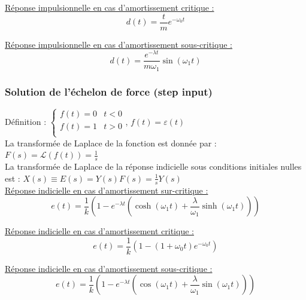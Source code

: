 \documentclass[../main.tex]{subfiles}
\begin{document}
\quad \underline{Réponse impulsionnelle en cas d'amortissement critique :}\\
\begin{equation}
    d(t) = \frac{t}{m}e^{-\omega_0 t}
\end{equation}

\quad \underline{Réponse impulsionnelle en cas d'amortissement sous-critique :}\\
\begin{equation}
    d(t) = \frac{e^{-\lambda t}}{m\omega_1}\sin(\omega_1 t)
\end{equation}

\subsubsection{Solution de l'échelon de force (step input)}
Définition : $\begin{cases}
    f(t) = 0 & t<0\\
    f(t) = 1 & t>0\\
\end{cases}$, $f(t) = \varepsilon(t)$\\

La transformée de Laplace de la fonction est donnée par : $F(s) = \mathcal{L}(f(t)) = \frac{1}{s}$\\

La transformée de Laplace de la réponse indicielle sous conditions initiales nulles est : $X(s) \equiv E(s) = Y(s) F(s) = \frac{1}{s} Y(s)$\\

\quad \underline{Réponse indicielle en cas d'amortissement sur-critique :}\\
\begin{equation}
    e(t) = \frac{1}{k} (1-e^{-\lambda t}(\cosh{(\omega_1t)} + \frac{\lambda}{\omega_1} \sinh{(\omega_1t)}))
\end{equation}

\quad \underline{Réponse indicielle en cas d'amortissement critique :}\\
\begin{equation}
    e(t) = \frac{1}{k} (1-(1+\omega_0t)e^{-\omega_0t})
\end{equation}

\quad \underline{Réponse indicielle en cas d'amortissement sous-critique :}\\
\begin{equation}
    e(t) = \frac{1}{k} (1-e^{-\lambda t}(\cos(\omega_1t)+\frac{\lambda}{\omega_1} \sin(\omega_1t)))
\end{equation}
\end{document}
